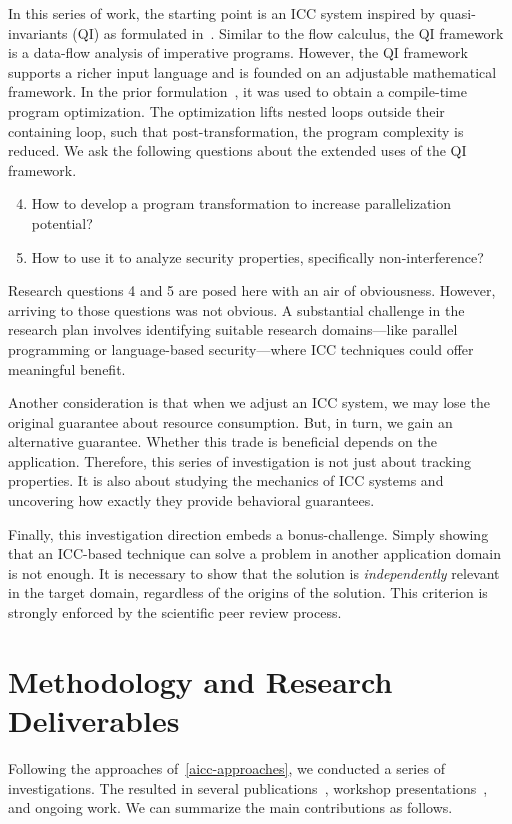 In this series of work, the starting point is an ICC system inspired by quasi-invariants (QI) as formulated in~\cite{moyen20172}.
Similar to the flow calculus, the QI framework is a data-flow analysis of imperative programs.
However, the QI framework supports a richer input language and is founded on an adjustable mathematical framework.
In the prior formulation~\cite{moyen20172}, it was used to obtain a compile-time program optimization.
The optimization lifts nested loops outside their containing loop, such that post-transformation, the program complexity is reduced.
We ask the following questions about the extended uses of the QI framework.
\begin{enumerate}[label={(RQ\arabic*)}]
\setcounter{enumi}{3}
\item How to develop a program transformation to increase parallelization potential?
\item How to use it to analyze security properties, specifically non-interference?
\end{enumerate}
Research questions 4 and 5 are posed here with an air of obviousness.
However, arriving to those questions was not obvious.
A substantial challenge in the research plan involves identifying suitable research domains---like parallel programming or language-based security---where ICC techniques could offer meaningful benefit.

Another consideration is that when we adjust an ICC system, we may lose the original guarantee about resource consumption.
But, in turn, we gain an alternative guarantee.
Whether this trade is beneficial depends on the application.
Therefore, this series of investigation is not just about tracking properties.
It is also about studying the mechanics of ICC systems and uncovering how exactly they provide behavioral guarantees.

Finally, this investigation direction embeds a bonus-challenge.
Simply showing that an ICC-based technique can solve a problem in another application domain is not enough.
It is necessary to show that the solution is \emph{independently} relevant in the target domain, regardless of the origins of the solution.
This criterion is strongly enforced by the scientific peer review process.

\section{Methodology and Research Deliverables}
\label{aicc-methods}

Following the approaches of~\autoref{aicc-approaches}, we conducted a series of investigations.
The resulted in several publications~\cite{aubert20222,aubert20232,aubert2023b},
workshop presentations~\cite{aubert20231,aubert202217,splash22}, and ongoing work.
We can summarize the main contributions as follows.

